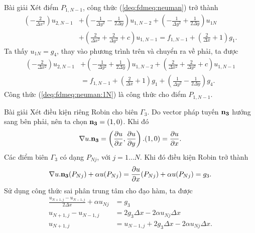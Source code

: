 \documentclass[9pt]{beamer}
\numberwithin{equation}{section}
\begin{document}
\begin{frame}
\begin{exampleblock}{Bài giải}
    Xét điểm $P_{1,N-1}$, công thức (\ref{deq:fdmeq:neuman}) trở thành
    \begin{align*}
        \left(-\frac{2}{\Delta x^2}\right) u_{2,N-1} &+
        \left(-\frac{1}{\Delta y^2} - \frac{1}{2 \Delta y}\right) u_{1,N-2} +
        \left(-\frac{1}{\Delta y^2} + \frac{1}{2 \Delta y}\right) u_{1N} \nonumber \\&+
        \left(\frac{2}{\Delta x^2} + \frac{2}{\Delta y^2} + c\right) u_{1,N-1} =
        f_{1,N-1} + \left(\frac{2}{\Delta x} + 1\right) g_1. 
    \end{align*}
    Ta thấy $u_{1N} = g_4$, thay vào phương trình trên và chuyển ra về phải, ta được
    \begin{align}
        \left(-\frac{2}{\Delta x^2}\right) u_{2,N-1} &+
        \left(-\frac{1}{\Delta y^2} + \frac{1}{2 \Delta y}\right) u_{1,N-2} +
        \left(\frac{2}{\Delta x^2} + \frac{2}{\Delta y^2} + c\right) u_{1,N-1} \nonumber \\&=
        f_{1,N-1} + \left(\frac{2}{\Delta x} + 1\right) g_1 +
        \left(\frac{1}{\Delta y^2} - \frac{1}{2 \Delta y}\right) g_4. \label{deq:fdmeq:neuman:1N}
    \end{align}
    Công thức (\ref{deq:fdmeq:neuman:1N}) là công thức cho điểm $P_{1,N-1}$.
\end{exampleblock}
\end{frame}

\begin{frame}
\begin{exampleblock}{Bài giải}
    Xét điều kiện riêng Robin cho biên $\Gamma_3$. Do vector pháp tuyến ${\bf n_3}$ hướng sang bên phải, nên ta chọn ${\bf n_3} = (1,0)$. Khi đó
    \begin{align*}
        \nabla u . {\bf n_3} = \left(\frac{\partial u}{\partial x}, \frac{\partial u}{\partial y}\right) . (1,0) = \frac{\partial u}{\partial x}.
    \end{align*}
    Các điểm biên $\Gamma_3$ có dạng $P_{Nj}$, với $j = 1 \ldots N$. Khi đó điều kiện Robin trở thành
    \begin{align*}
    \nabla u . {\bf n_3}(P_{Nj}) + \alpha u(P_{Nj}) = \frac{\partial u}{\partial x}(P_{Nj}) + \alpha u(P_{Nj}) = g_3.
    \end{align*}
    Sử dụng công thức sai phân trung tâm cho đạo hàm, ta được
    \begin{align*}
        \frac{u_{N+1,j} - u_{N-1,j}}{2 \Delta x} + \alpha u_{Nj} &= g_3 \\
        u_{N+1,j} - u_{N-1,j} &= 2 g_3 \Delta x - 2 \alpha u_{Nj} \Delta x \\
        u_{N+1,j} &= u_{N-1,j} + 2 g_3 \Delta x - 2 \alpha u_{Nj} \Delta x.
    \end{align*}
\end{exampleblock}
\end{frame}
\end{document}
